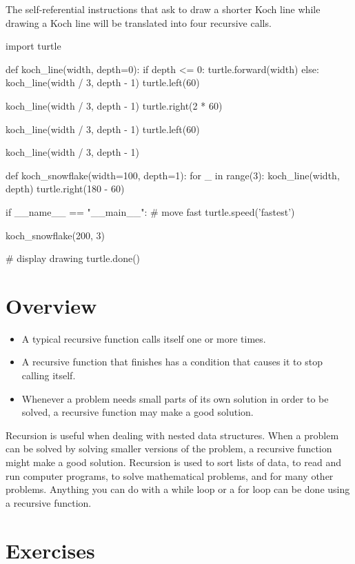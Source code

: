 \documentclass[11pt]{cselabheader}
\begin{document}
The self-referential instructions that ask to draw a shorter Koch line
while drawing a Koch line will be translated into four recursive calls.

\begin{python3code}
import turtle

def koch_line(width, depth=0):
    if depth <= 0:
        turtle.forward(width)
    else:
        koch_line(width / 3, depth - 1)
        turtle.left(60)

        koch_line(width / 3, depth - 1)
        turtle.right(2 * 60)

        koch_line(width / 3, depth - 1)
        turtle.left(60)

        koch_line(width / 3, depth - 1)

def koch_snowflake(width=100, depth=1):
    for _ in range(3):
        koch_line(width, depth)
        turtle.right(180 - 60)

if __name__ == "__main__":
    # move fast
    turtle.speed('fastest')

    koch_snowflake(200, 3)

    # display drawing
    turtle.done()
\end{python3code}

\newpage
\section{Overview}
\begin{itemize}
\item A typical recursive function calls itself one or more times.
\item A recursive function that finishes has a condition that causes
it to stop calling itself.
\item Whenever a problem needs small parts of its own solution in
order to be solved, a recursive function may make a good solution.
\end{itemize}

Recursion is useful when dealing with nested data structures. When
a problem can be solved by solving smaller versions of the problem, a
recursive function might make a good solution.  Recursion is used to
sort lists of data, to read and run computer programs, to solve
mathematical problems, and for many other problems. Anything you can
do with a while loop or a for loop can be done using a recursive function.

\newpage
\section{Exercises}
\end{document}
